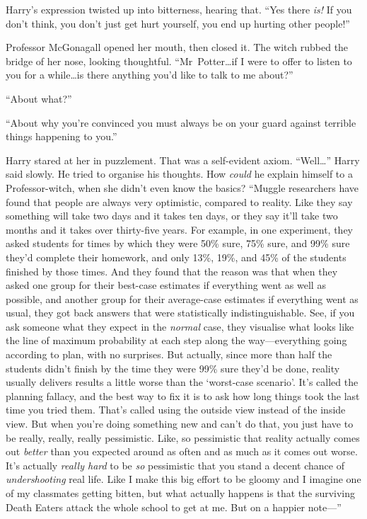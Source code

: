 Harry’s expression twisted up into bitterness, hearing that. “Yes there \emph{is!} If you don’t think, you don’t just get hurt yourself, you end up hurting other people!”

Professor McGonagall opened her mouth, then closed it. The witch rubbed the bridge of her nose, looking thoughtful. “Mr~Potter…if I were to offer to listen to you for a while…is there anything you’d like to talk to me about?”

“About what?”

“About why you’re convinced you must always be on your guard against terrible things happening to you.”

Harry stared at her in puzzlement. That was a self-evident axiom. “Well…” Harry said slowly. He tried to organise his thoughts. How \emph{could} he explain himself to a Professor-witch, when she didn’t even know the basics? “Muggle researchers have found that people are always very optimistic, compared to reality. Like they say something will take two days and it takes ten days, or they say it’ll take two months and it takes over thirty-five years. For example, in one experiment, they asked students for times by which they were 50\% sure, 75\% sure, and 99\% sure they’d complete their homework, and only 13\%, 19\%, and 45\% of the students finished by those times. And they found that the reason was that when they asked one group for their best-case estimates if everything went as well as possible, and another group for their average-case estimates if everything went as usual, they got back answers that were statistically indistinguishable. See, if you ask someone what they expect in the \emph{normal} case, they visualise what looks like the line of maximum probability at each step along the way—everything going according to plan, with no surprises. But actually, since more than half the students didn’t finish by the time they were 99\% sure they’d be done, reality usually delivers results a little worse than the ‘worst-case scenario’. It’s called the planning fallacy, and the best way to fix it is to ask how long things took the last time you tried them. That’s called using the outside view instead of the inside view. But when you’re doing something new and can’t do that, you just have to be really, really, really pessimistic. Like, so pessimistic that reality actually comes out \emph{better} than you expected around as often and as much as it comes out worse. It’s actually \emph{really hard} to be \emph{so} pessimistic that you stand a decent chance of \emph{undershooting} real life. Like I make this big effort to be gloomy and I imagine one of my classmates getting bitten, but what actually happens is that the surviving Death Eaters attack the whole school to get at me. But on a happier note—”

